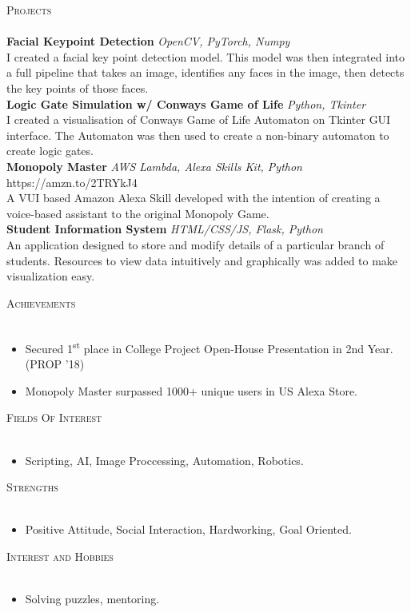 \documentclass[12pt, a4paper]{article}
\newcommand{\lineunder} {
    \vspace*{-8pt} \\
    \hspace*{-18pt} \hrulefill \\
}
\newcommand{\header} [1] {
    {\hspace*{-18pt}\vspace*{6pt} \textsc{#1}}
    \vspace*{-6pt} \lineunder
}
\begin{document}
\header{Projects}
{\textbf{Facial Keypoint Detection}} {\sl OpenCV, PyTorch, Numpy} \\
I created a facial key point detection model. This model was then integrated into a full pipeline that takes an image, identifies any faces in the image, then detects the key points of those faces.\\
\vspace*{2mm}
{\textbf{Logic Gate Simulation w/ Conway\textquotesingle{}s Game of Life}} {\sl Python, Tkinter} \\
I created a visualisation of Conway\textquotesingle{}s Game of Life Automaton on Tkinter GUI interface. The Automaton was then used to create a non-binary automaton to create logic gates.\\
\vspace*{2mm}
{\textbf{Monopoly Master}} {\sl AWS Lambda, Alexa Skills Kit, Python} \hfill https://amzn.to/2TRYkJ4\\
A VUI based Amazon Alexa Skill developed with the intention of creating a voice-based assistant to the original Monopoly Game.\\
\vspace*{2mm}
{\textbf{Student Information System}} {\sl HTML/CSS/JS, Flask, Python} \\
An application designed to store and modify details of a particular branch of students. Resources to view data intuitively and graphically was added to make visualization easy.\\
\vspace*{2mm}



\header{Achievements}

\begin{itemize}
\item Secured 1\textsuperscript{st} place in College Project Open-House Presentation in 2nd Year. (PROP '18) 
\item Monopoly Master surpassed 1000+ unique users in US Alexa Store.
\end{itemize}

\header{Fields Of Interest}
\begin{itemize}
\item Scripting, AI, Image Proccessing, Automation, Robotics.
\end{itemize}


\header{Strengths}
\begin{itemize}
\item  Positive Attitude, Social Interaction, Hardworking, Goal Oriented.
\end{itemize}



\header{Interest and Hobbies}
\begin{itemize}
\item  Solving puzzles, mentoring.
\end{itemize}
\end{document}
